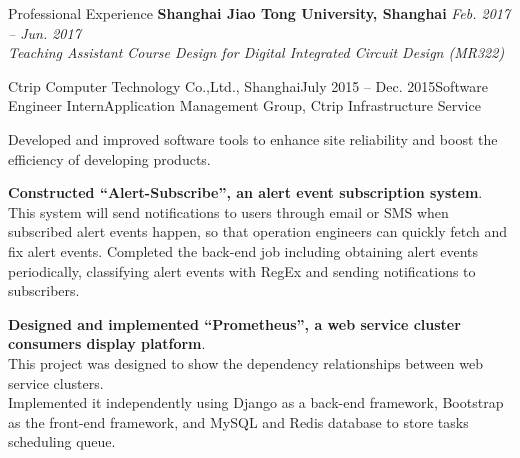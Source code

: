 \documentclass{resume_ucla} %
\begin{document}
\begin{rSection}{Professional Experience}
\textbf{Shanghai Jiao Tong University, Shanghai} \hfill \emph{Feb. 2017 -- Jun. 2017}
\\\emph{Teaching Assistant} \hfill \emph {Course Design for Digital Integrated Circuit Design (MR322) }\\
\begin{rSubsection}{Ctrip Computer Technology Co.,Ltd., Shanghai}{July 2015 -- Dec. 2015}{Software Engineer Intern}{Application Management Group, Ctrip Infrastructure Service}
\item Developed and improved software tools to enhance site reliability and boost the efficiency of developing products.
\item \textbf{Constructed ``Alert-Subscribe'', an alert event subscription system}.  \\
This system will send notifications to users through email or SMS when subscribed alert events happen, so that operation engineers can quickly fetch and fix alert events. Completed the back-end job including obtaining alert events periodically, classifying alert events with RegEx and sending notifications to subscribers.
\item \textbf{Designed and implemented ``Prometheus'', a web service cluster consumers display platform}. \\
This project was designed to show the dependency relationships between web service clusters. \\
Implemented it independently using Django as a back-end framework, Bootstrap as the front-end framework, and MySQL and Redis database to store tasks scheduling queue.
\end{rSubsection}
\end{rSection}
\end{document}
